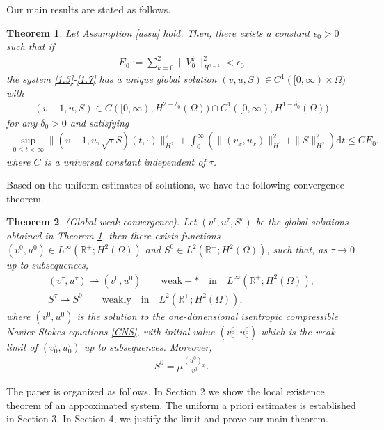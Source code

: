\documentclass[10pt,reqno]{amsart}
\numberwithin{equation}{section}
\newtheorem{theorem}{Theorem}[section]
\newcommand{\dif}{\mathrm{d}}
\newcommand{\SUM}[3]{\sum\limits_{{#1}={#2}}^{#3}}
\begin{document}
Our main results are stated as follows.
\begin{theorem}\label{th1.1}
Let Assumption \ref{assu} hold. Then, there exists a constant $\epsilon_0>0$ such that if 
\begin{align}
E_0:=\SUM k 0 2 \|V_0^k\|_{H^{2-k}}^2<\epsilon_0
\end{align}
the system \eqref{1.5}-\eqref{1.7} has a unique global solution $(v, u, S)\in C^1([0,\infty)\times \Omega)$ with
\begin{align}
(v-1, u, S)\in C([0, \infty), H^{2-\delta_0}(\Omega)) \cap C^1([0, \infty), H^{1-\delta_0}(\Omega))
\end{align}
for any $\delta_0>0$ and
satisfying
\begin{align}
\sup_{0\le t <\infty}\|(v-1, u, \sqrt{\tau}S)(t, \cdot)\|_{H^2}^2+ \int_0^\infty \left( \|(v_x, u_x)\|_{H^1}^2+ \|S\|_{H^2}^2 \right) \dif t \le C E_0,
\end{align}
where $C$ is a universal constant independent of $\tau$.
\end{theorem}
Based on the uniform estimates of solutions, we have the following convergence theorem.
\begin{theorem}\label{th1.2}
(Global weak convergence). Let  $(v^\tau, u^\tau, S^\tau)$ be the global solutions obtained in Theorem \ref{th1.1}, then there exists
functions $( v^0,  u^0)\in L^\infty(\mathbb R^+; H^2(\Omega))$ and $S^0\in L^2(\mathbb R^+; H^2(\Omega))$, such that, as $\tau\rightarrow 0$ up to subsequences,
\begin{align}
(v^\tau, u^\tau) \rightharpoonup ( v^0,  u^0) \qquad \mathrm{weak}-\ast \quad \mathrm{in}\quad L^\infty(\mathbb R^+; H^2(\Omega)),\label{1.17}\\
S^\tau \rightharpoonup  S^0 \qquad \mathrm{weakly} \quad \mathrm{in}\quad L^2(\mathbb R^+; H^2(\Omega)), \label{1.18}
\end{align}
where $(v^0,  u^0)$ is the solution to the one-dimensional  isentropic compressible Navier-Stokes equations  \eqref{CNS}, with initial value $( v_0^0,  u_0^0)$ which 
is the weak limit of $(v_0^\tau, u_0^\tau)$ up to subsequences. Moreover, 
\begin{align*}
 S^0=\mu   \frac{(u^0)_x}{v^0}.
\end{align*}
\end{theorem}


The paper is organized as follows. In Section 2 we show the local existence theorem of an approximated system. The uniform a priori estimates is established in Section 3. In Section 4, we justify the limit and prove our main theorem.
\end{document}

